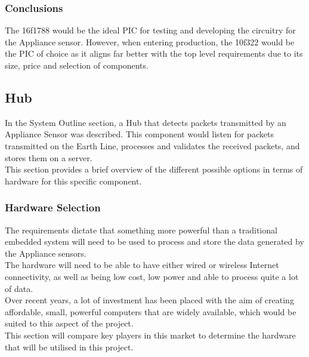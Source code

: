 \documentclass[draft,preprint,12pt,3p]{elsarticle}
\begin{document}




\subsubsection{Conclusions}
The 16f1788 would be the ideal PIC for testing and developing the circuitry for the Appliance sensor. However, when entering production, the 10f322 would be the PIC of choice as it aligns far better with the top level requirements due to its size, price and selection of components.\\


\clearpage
\subsection{Hub}
In the System Outline section, a Hub that detects packets transmitted by an Appliance Sensor was described. This component would listen for packets transmitted on the Earth Line, processes and validates the received packets, and stores them on a server.\\
This section provides a brief overview of the different possible options in terms of hardware for this specific component.
\subsubsection{Hardware Selection}
The requirements dictate that something more powerful than a traditional embedded system will need to be used to process and store the data generated by the Appliance sensors.\\
The hardware will need to be able to have either wired or wireless Internet connectivity, as well as being low cost, low power and able to process quite a lot of data.\\
Over recent years, a lot of investment has been placed with the aim of creating affordable, small, powerful computers that are widely available, which would be suited to this aspect of the project.\\
This section will compare key players in this market to determine the hardware that will be utilised in this project.
\end{document}
